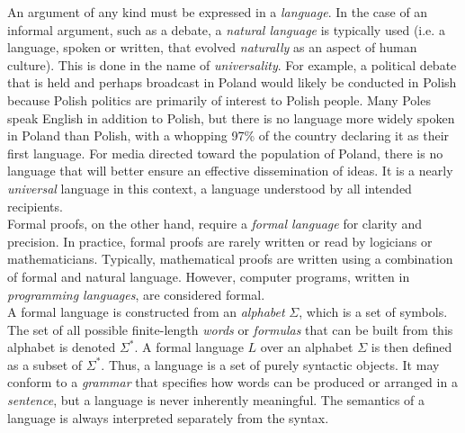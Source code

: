 
An argument of any kind must be expressed in a \textit{language}. In the case of an informal argument, such as a debate, a \textit{natural language} is typically used (i.e. a language, spoken or written, that evolved \textit{naturally} as an aspect of human culture). This is done in the name of \textit{universality}. For example, a political debate that is held and perhaps broadcast in Poland would likely be conducted in Polish because Polish politics are primarily of interest to Polish people. Many Poles speak English in addition to Polish, but there is no language more widely spoken in Poland than Polish, with a whopping 97\% of the country declaring it as their first language. For media directed toward the population of Poland, there is no language that will better ensure an effective dissemination of ideas. It is a nearly \textit{universal} language in this context, a language understood by all intended recipients. \\

Formal proofs, on the other hand, require a \textit{formal language} for clarity and precision. In practice, formal proofs are rarely written or read by logicians or mathematicians. Typically, mathematical proofs are written using a combination of formal and natural language. However, computer programs, written in \textit{programming languages}, are considered formal. \\

A formal language is constructed from an \textit{alphabet} $\Sigma$, which is a set of symbols. The set of all possible finite-length \textit{words} or \textit{formulas} that can be built from this alphabet is denoted $\Sigma^*$. A formal language $L$ over an alphabet $\Sigma$ is then defined as a subset of $\Sigma^*$. Thus, a language is a set of purely syntactic objects. It may conform to a \textit{grammar} that specifies how words can be produced or arranged in a \textit{sentence}, but a language is never inherently meaningful. The semantics of a language is always interpreted separately from the syntax.



